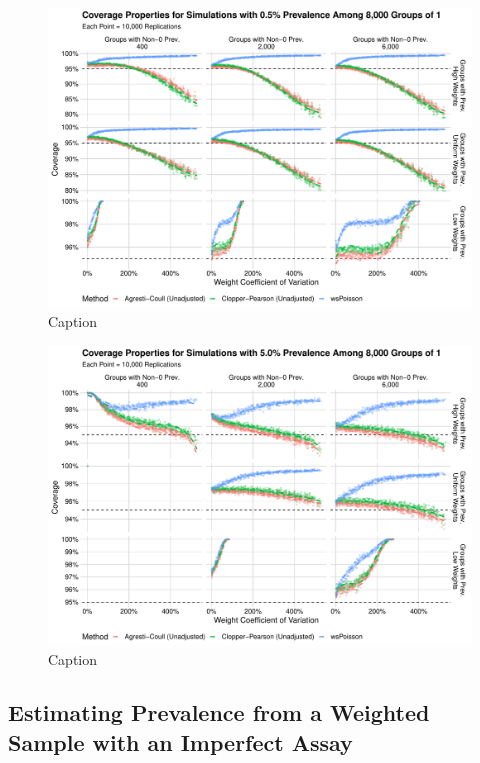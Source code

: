 \documentclass[AMA,STIX1COL]{WileyNJD-v2}
\begin{document}
\begin{figure}
    \centering
    \includegraphics[width=\textwidth]{figures/perfect_coverage_8000_0_005_reduced.pdf}
    \caption{Caption}
    \label{fig:perfect_coverage_8000_0_005_reduced}
\end{figure}

\begin{figure}
    \centering
    \includegraphics[width=\textwidth]{figures/perfect_coverage_8000_0_05_reduced.pdf}
    \caption{Caption}
    \label{fig:perfect_coverage_8000_0_05_reduced.pdf}
\end{figure}



\subsection{Estimating Prevalence from a Weighted Sample with an  Imperfect Assay}
\end{document}
